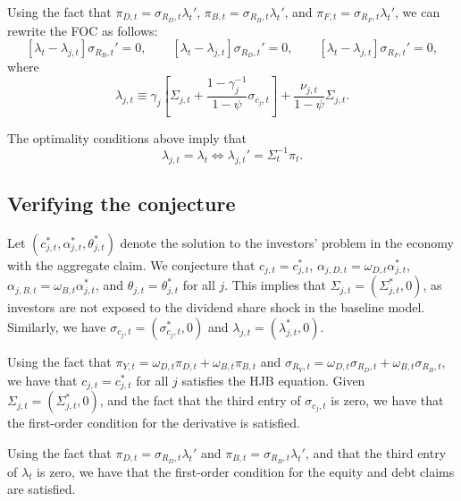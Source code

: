 \documentclass[11pt,english]{article}
\begin{document}
Using the fact that $\pi_{D,t} = \sigma_{R_D,t} \lambda_t'$, $\pi_{B,t} = \sigma_{R_B,t} \lambda_t'$, and $\pi_{F,t} = \sigma_{R_F,t} \lambda_t'$, we can rewrite the FOC as follows:
\begin{equation}
	\left[ \lambda_t - \lambda_{j,t}  \right] \sigma_{R_B,t}'  = 0, \qquad 
	\left[ \lambda_t - \lambda_{j,t}  \right] \sigma_{R_D,t}'  = 0, \qquad 
	\left[ \lambda_t - \lambda_{j,t}  \right] \sigma_{R_F,t}'  = 0,
\end{equation}
where
\begin{equation}
	\lambda_{j,t} \equiv \gamma_j \left[\Sigma_{j,t} + \frac{1 - \gamma_j^{-1}}{1-\psi} \sigma_{c_j,t}\right] + \frac{\nu_{j,t}}{1-\psi} \Sigma_{j,t}.
\end{equation}

The optimality conditions above imply that
\begin{equation}
    \lambda_{j,t} = \lambda_t \iff \lambda_{j,t}' = \Sigma_t^{-1} \pi_t.
\end{equation}

\subsection{Verifying the conjecture}

Let $(c_{j,t}^ *, \alpha_{j,t}^ *, \theta_{j,t}^ *)$ denote the solution to the investors' problem in the economy with the aggregate claim.
We conjecture that $c_{j,t} = c_{j,t}^*$, $\alpha_{j,D,t} = \omega_{D,t} \alpha_{j,t}^*$, $\alpha_{j,B,t} = \omega_{B,t} \alpha_{j,t}^*$, and $\theta_{j,t} = \theta_{j,t}^*$ for all $j$.
This implies that $\Sigma_{j,t} = (\Sigma_{j,t}^ *, 0)$, as investors are not exposed to the dividend share shock in the baseline model.
Similarly, we have $\sigma_{c_j,t} = (\sigma_{c_j,t}^*,0)$ and $\lambda_{j,t} = (\lambda_{j,t}^*,0)$.

Using the fact that $\pi_{Y,t} = \omega_{D,t} \pi_{D,t} + \omega_{B,t} \pi_{B,t}$ and 
$\sigma_{R_Y,t} = \omega_{D,t} \sigma_{R_D,t} + \omega_{B,t} \sigma_{R_B,t}$, we have that $c_{j,t} = c_{j,t}^*$ for all $j$ satisfies the HJB equation.
Given $\Sigma_{j,t} = (\Sigma_{j,t}^*,0)$, and the fact that the third entry of $\sigma_{c_j,t}$ is zero, we have that the first-order condition for the derivative is satisfied.


Using the fact that $\pi_{D,t} = \sigma_{R_D,t} \lambda_t'$ and $\pi_{B,t} = \sigma_{R_B,t} \lambda_t'$, and that the third entry of $\lambda_t$ is zero, we have that the first-order condition for the equity and debt claims are satisfied.
\end{document}
